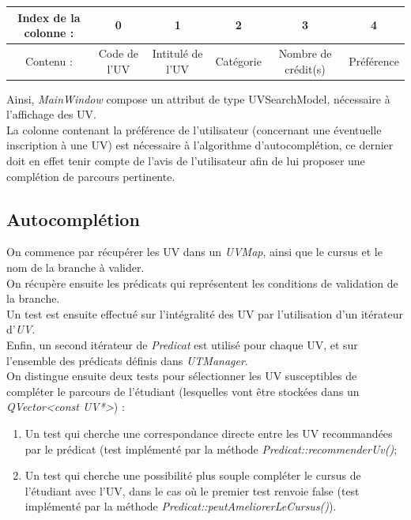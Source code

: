 \documentclass[a4paper,10pt,french]{report}
\begin{document}
	\begin{tabular}{|c||c|c|c|c|c|}
	\hline
	Index de la colonne :  & 0 & 1 & 2 & 3 & 4 \\ \hline
	Contenu : & Code de l'UV & Intitulé de l'UV & Catégorie & Nombre de crédit(s) & Préférence \\
	\hline
	\end{tabular}
    Ainsi, \emph{MainWindow} compose un attribut de type UVSearchModel, nécessaire à l'affichage des UV.\\ %
    
	
	La colonne contenant la préférence de l'utilisateur (concernant une éventuelle inscription à une UV) est nécessaire à l'algorithme d'autocomplétion, ce dernier doit en effet tenir compte de l'avis de l'utilisateur afin de lui proposer une complétion de parcours pertinente.
    
    
        
    \subsection{Autocomplétion}\label{subsec:Autocomplétion}
On commence par récupérer les UV dans un \emph{UVMap}, ainsi que le cursus et le nom de la branche à valider.\\
On récupère ensuite les prédicats qui représentent les conditions de validation de la branche.\\
Un test est ensuite effectué sur l'intégralité des UV par l'utilisation d'un itérateur d'\emph{UV}.\\
Enfin, un second itérateur de \emph{Predicat} est utilisé pour chaque UV, et sur l'ensemble des prédicats définis dans \emph{UTManager}.\\
On distingue ensuite deux tests pour sélectionner les UV susceptibles de compléter le parcours de l'étudiant (lesquelles vont être stockées dans un \emph{QVector<const UV*>}) :
\begin{enumerate}
\item Un test qui cherche une correspondance directe entre les UV recommandées par le prédicat (test implémenté par la méthode \emph{Predicat::recommenderUv()};
\item Un test qui cherche une possibilité plus souple compléter le cursus de l'étudiant avec l'UV, dans le cas où le premier test renvoie false (test implémenté par la méthode \emph{Predicat::peutAmeliorerLeCursus()}).
\end{enumerate}
\end{document}
